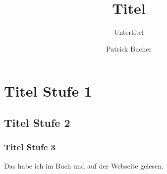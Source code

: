 \documentclass[a4paper,11pt]{scrartcl}
\begin{document}
\title{Titel}
\subtitle{Untertitel}
\author{Patrick Bucher}
\maketitle

\tableofcontents

\section{Titel Stufe 1}
\subsection{Titel Stufe 2}
\subsubsection{Titel Stufe 3}
Das habe ich im Buch \cite[Seite 12-13]{buch} und auf der Webseite \cite{webseite} gelesen.



\end{document}
